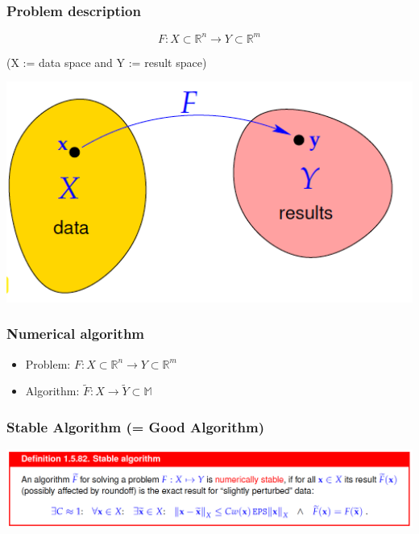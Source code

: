 \documentclass[12pt, a4paper]{article}
\newcommand{\R}{\mathbb{R}}
\newcommand{\M}{\mathbb{M}}
\begin{document}
\subsubsection{Problem description}
\begin{minipage}{0.6\textwidth}
	\begin{equation*}
	F: X \subset \R^{n} \longrightarrow Y \subset \R^{m}	
	\end{equation*}
	\begin{center}
		(X := data space and Y := result space)
	\end{center}
\end{minipage}
\begin{minipage}{0.3\textwidth}\raggedleft
	\begin{center}
	 \includegraphics[width=1.0\textwidth]{stable_problem_desc.png}
\end{center}
\end{minipage}


\subsubsection{Numerical algorithm}
\begin{itemize}
	\item Problem: \quad  \quad $F: X \subset \R^{n} \longrightarrow Y \subset \R^{m}	$
	\item Algorithm: \quad  $\tilde{F}: X \rightarrow \tilde{Y} \subset \M$
\end{itemize}



\subsubsection{Stable Algorithm (= Good Algorithm)}
\begin{center}
	 \includegraphics[width=1.0\textwidth]{stable_algorithm1.png}
\end{center}
\end{document}
